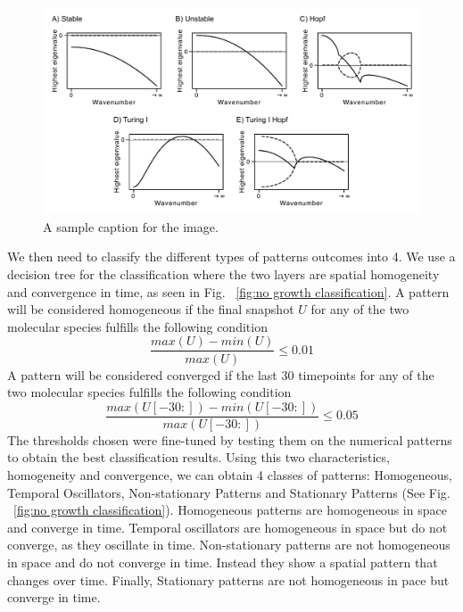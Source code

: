 \begin{figure}[H] %
    \centering
    \includegraphics[width=1\textwidth]{chapters/Chapter 1/dispersions} %
    \caption{A sample caption for the image.}
    \label{fig:dispersions} %
\end{figure} %

We then need to classify the different types of patterns outcomes into 4.
We use a decision tree for the classification where the two layers are spatial homogeneity and convergence in time, as seen in Fig. ~\ref{fig:no growth classification}.
A pattern will be considered homogeneous if the final snapshot $U$ for any of the two molecular species fulfills the following condition
\begin{equation}
    \frac{max(U) - min(U)}{max(U)} \leq 0.01
\end{equation}
A pattern will be considered converged if the last 30 timepoints for any of the two molecular species fulfills the following condition
\begin{equation}
    \frac{max(U[-30:]) - min(U[-30:])}{max(U[-30:])} \leq 0.05
\end{equation}
The thresholds chosen were fine-tuned by testing them on the numerical patterns to obtain the best classification results.
Using this two characteristics, homogeneity and convergence, we can obtain 4 classes of patterns: Homogeneous, Temporal Oscillators, Non-stationary Patterns and Stationary Patterns (See Fig. ~\ref{fig:no growth classification}).
Homogeneous patterns are homogeneous in space and converge in time.
Temporal oscillators are homogeneous in space but do not converge, as they oscillate in time.
Non-stationary patterns are not homogeneous in space and do not converge in time.
Instead they show a spatial pattern that changes over time.
Finally, Stationary patterns are not homogeneous in pace but converge in time.


